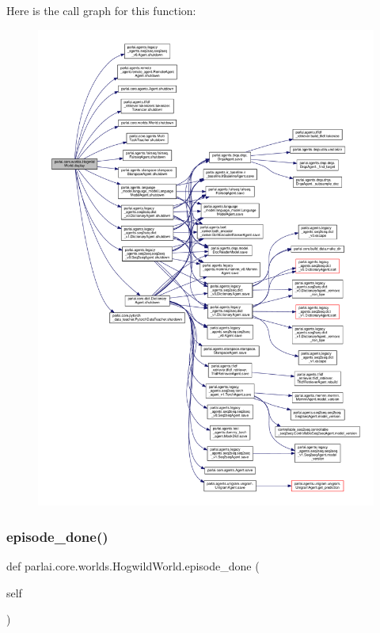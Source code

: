 Here is the call graph for this function\+:
\nopagebreak
\begin{figure}[H]
\begin{center}
\leavevmode
\includegraphics[width=350pt]{classparlai_1_1core_1_1worlds_1_1HogwildWorld_a1b7aed0a7b56712f22ee8b04c65d7c00_cgraph}
\end{center}
\end{figure}
\mbox{\label{classparlai_1_1core_1_1worlds_1_1HogwildWorld_a0425099fbc33cb97d6fbe67dbd2e8a1f}} 
\subsubsection{\texorpdfstring{episode\+\_\+done()}{episode\_done()}}
{\footnotesize\ttfamily def parlai.\+core.\+worlds.\+Hogwild\+World.\+episode\+\_\+done (\begin{DoxyParamCaption}\item[{}]{self }\end{DoxyParamCaption})}

